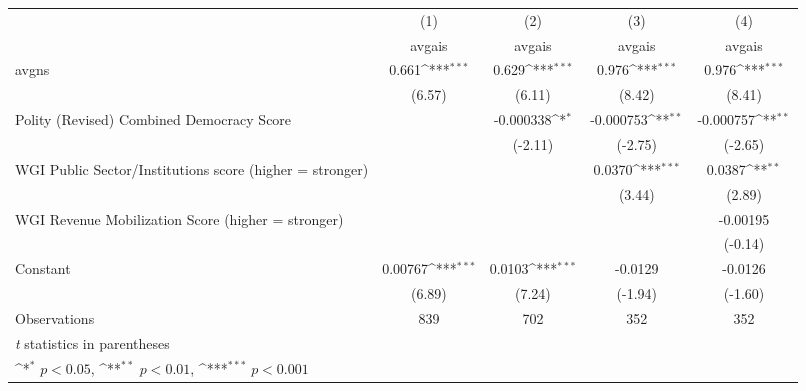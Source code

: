 {
\def\sym#1{\ifmmode^{#1}\else\(^{#1}\)\fi}
\begin{tabular}{l*{4}{c}}
\hline\hline
                &\multicolumn{1}{c}{(1)}&\multicolumn{1}{c}{(2)}&\multicolumn{1}{c}{(3)}&\multicolumn{1}{c}{(4)}\\
                &\multicolumn{1}{c}{avgais}&\multicolumn{1}{c}{avgais}&\multicolumn{1}{c}{avgais}&\multicolumn{1}{c}{avgais}\\
\hline
avgns           &    0.661\sym{***}&    0.629\sym{***}&    0.976\sym{***}&    0.976\sym{***}\\
                &   (6.57)         &   (6.11)         &   (8.42)         &   (8.41)         \\
[1em]
Polity (Revised) Combined Democracy Score&                  &-0.000338\sym{*}  &-0.000753\sym{**} &-0.000757\sym{**} \\
                &                  &  (-2.11)         &  (-2.75)         &  (-2.65)         \\
[1em]
WGI Public Sector/Institutions score (higher = stronger)&                  &                  &   0.0370\sym{***}&   0.0387\sym{**} \\
                &                  &                  &   (3.44)         &   (2.89)         \\
[1em]
WGI Revenue Mobilization Score (higher = stronger)&                  &                  &                  & -0.00195         \\
                &                  &                  &                  &  (-0.14)         \\
[1em]
Constant        &  0.00767\sym{***}&   0.0103\sym{***}&  -0.0129         &  -0.0126         \\
                &   (6.89)         &   (7.24)         &  (-1.94)         &  (-1.60)         \\
\hline
Observations    &      839         &      702         &      352         &      352         \\
\hline\hline
\multicolumn{5}{l}{\footnotesize \textit{t} statistics in parentheses}\\
\multicolumn{5}{l}{\footnotesize \sym{*} \(p<0.05\), \sym{**} \(p<0.01\), \sym{***} \(p<0.001\)}\\
\end{tabular}
}
